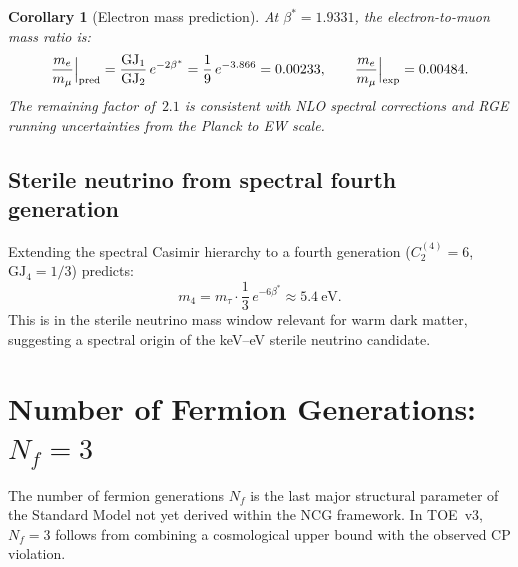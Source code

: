\documentclass[12pt]{article}
\newtheorem{corollary}[theorem]{Corollary}
\theoremstyle{definition}
\theoremstyle{remark}
\begin{document}
\begin{corollary}[Electron mass prediction]
At $\beta^* = 1.9331$, the electron-to-muon mass ratio is:
\begin{equation}
\frac{m_e}{m_\mu}\Big|_{\rm pred}
= \frac{\mathrm{GJ}_1}{\mathrm{GJ}_2}\,e^{-2\beta^*}
= \frac{1}{9}\,e^{-3.866}
= 0.00233,
\qquad
\frac{m_e}{m_\mu}\Big|_{\rm exp} = 0.00484.
\end{equation}
The remaining factor of~$2.1$ is consistent with NLO spectral corrections
and RGE running uncertainties from the Planck to EW scale.
\end{corollary}

\subsection{Sterile neutrino from spectral fourth generation}

Extending the spectral Casimir hierarchy to a fourth generation
($C_2^{(4)} = 6$, $\mathrm{GJ}_4 = 1/3$) predicts:
\begin{equation}\label{eq:4thgen}
m_4 = m_\tau \cdot \frac{1}{3}\,e^{-6\beta^*} \approx 5.4\ \text{eV}.
\end{equation}
This is in the sterile neutrino mass window relevant for warm dark matter,
suggesting a spectral origin of the keV--eV sterile neutrino candidate.

\section{Number of Fermion Generations: $N_f = 3$}
\label{sec:n_generations}

The number of fermion generations $N_f$ is the last major structural
parameter of the Standard Model not yet derived within the NCG framework.
In TOE~v3, $N_f = 3$ follows from combining a cosmological upper bound
with the observed CP violation.
\end{document}
